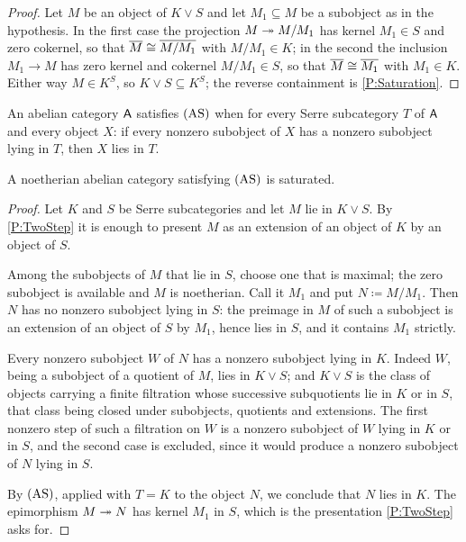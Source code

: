 \begin{proof}
  \leanok
  Let \(M\) be an object of \(K\vee S\) and let \(M_{1}\subseteq M\) be a subobject as in the hypothesis. In the first case the projection \(M\twoheadrightarrow M/M_{1}\) has kernel \(M_{1}\in S\) and zero cokernel, so that \(\overline{M}\cong\overline{M/M_{1}}\) with \(M/M_{1}\in K\); in the second the inclusion \(M_{1}\to M\) has zero kernel and cokernel \(M/M_{1}\in S\), so that \(\overline{M}\cong\overline{M_{1}}\) with \(M_{1}\in K\). Either way \(M\in K^{S}\), so \(K\vee S\subseteq K^{S}\); the reverse containment is \prox\ref{P:Saturation}.
\end{proof}

\begin{definition}
  \label{D:AS}  \leanok
  An abelian category \(\mathsf{A}\) satisfies \(\textup{(AS)}\) when for every Serre subcategory \(T\) of \(\mathsf{A}\) and every object \(X\): if every nonzero subobject of \(X\) has a nonzero subobject lying in \(T\), then \(X\) lies in \(T\).
\end{definition}

\begin{proposition}
  \label{P:ASimplies}   \leanok
  A noetherian abelian category satisfying \(\textup{(AS)}\) is saturated.
\end{proposition}

\begin{proof}
  \leanok
  Let \(K\) and \(S\) be Serre subcategories and let \(M\) lie in \(K\vee S\). By \prox\ref{P:TwoStep} it is enough to present \(M\) as an extension of an object of \(K\) by an object of \(S\).

	Among the subobjects of \(M\) that lie in \(S\), choose one that is maximal; the zero subobject is available and \(M\) is noetherian. Call it \(M_{1}\) and put \(N\coloneq M/M_{1}\). Then \(N\) has no nonzero subobject lying in \(S\): the preimage in \(M\) of such a subobject is an extension of an object of \(S\) by \(M_{1}\), hence lies in \(S\), and it contains \(M_{1}\) strictly.

	Every nonzero subobject \(W\) of \(N\) has a nonzero subobject lying in \(K\). Indeed \(W\), being a subobject of a quotient of \(M\), lies in \(K\vee S\); and \(K\vee S\) is the class of objects carrying a finite filtration whose successive subquotients lie in \(K\) or in \(S\), that class being closed under subobjects, quotients and extensions. The first nonzero step of such a filtration on \(W\) is a nonzero subobject of \(W\) lying in \(K\) or in \(S\), and the second case is excluded, since it would produce a nonzero subobject of \(N\) lying in \(S\).

	By \(\textup{(AS)}\), applied with \(T=K\) to the object \(N\), we conclude that \(N\) lies in \(K\). The epimorphism \(M\twoheadrightarrow N\) has kernel \(M_{1}\) in \(S\), which is the presentation \prox\ref{P:TwoStep} asks for.
\end{proof}

